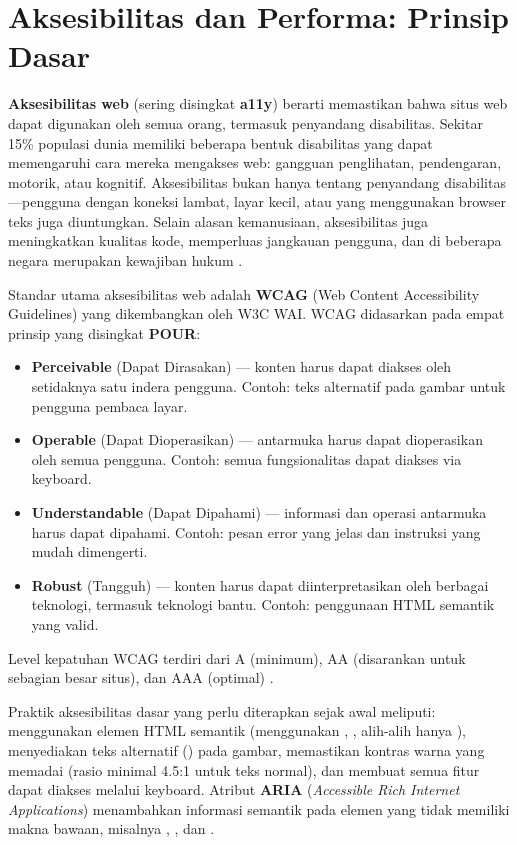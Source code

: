 ﻿\section{Aksesibilitas dan Performa: Prinsip Dasar}
\textbf{Aksesibilitas web} (sering disingkat \textbf{a11y}) berarti memastikan bahwa situs web dapat digunakan oleh semua orang, termasuk penyandang disabilitas. Sekitar 15\% populasi dunia memiliki beberapa bentuk disabilitas yang dapat memengaruhi cara mereka mengakses web: gangguan penglihatan, pendengaran, motorik, atau kognitif. Aksesibilitas bukan hanya tentang penyandang disabilitas---pengguna dengan koneksi lambat, layar kecil, atau yang menggunakan browser teks juga diuntungkan. Selain alasan kemanusiaan, aksesibilitas juga meningkatkan kualitas kode, memperluas jangkauan pengguna, dan di beberapa negara merupakan kewajiban hukum \cite{mdnAccessibility}.

Standar utama aksesibilitas web adalah \textbf{WCAG} (Web Content Accessibility Guidelines) yang dikembangkan oleh W3C WAI. WCAG didasarkan pada empat prinsip yang disingkat \textbf{POUR}:
\begin{itemize}
  \item \textbf{Perceivable} (Dapat Dirasakan) --- konten harus dapat diakses oleh setidaknya satu indera pengguna. Contoh: teks alternatif pada gambar untuk pengguna pembaca layar.
  \item \textbf{Operable} (Dapat Dioperasikan) --- antarmuka harus dapat dioperasikan oleh semua pengguna. Contoh: semua fungsionalitas dapat diakses via keyboard.
  \item \textbf{Understandable} (Dapat Dipahami) --- informasi dan operasi antarmuka harus dapat dipahami. Contoh: pesan error yang jelas dan instruksi yang mudah dimengerti.
  \item \textbf{Robust} (Tangguh) --- konten harus dapat diinterpretasikan oleh berbagai teknologi, termasuk teknologi bantu. Contoh: penggunaan HTML semantik yang valid.
\end{itemize}
Level kepatuhan WCAG terdiri dari A (minimum), AA (disarankan untuk sebagian besar situs), dan AAA (optimal) \cite{webdevAccessibility}.

Praktik aksesibilitas dasar yang perlu diterapkan sejak awal meliputi: menggunakan elemen HTML semantik (menggunakan , ,  alih-alih hanya ), menyediakan teks alternatif () pada gambar, memastikan kontras warna yang memadai (rasio minimal 4.5:1 untuk teks normal), dan membuat semua fitur dapat diakses melalui keyboard. Atribut \textbf{ARIA} (\textit{Accessible Rich Internet Applications}) menambahkan informasi semantik pada elemen yang tidak memiliki makna bawaan, misalnya , , dan  \cite{mdnAccessibility}.

